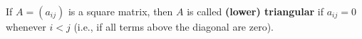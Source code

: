 If $A = (a_{ij})$ is a square matrix, then $A$ is called \textbf{(lower) triangular} if $a_{ij} = 0$ whenever $i < j$ (i.e., if all terms above the diagonal are zero).
